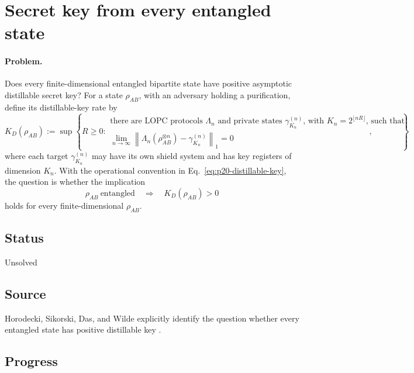 \section{Secret key from every entangled state}
\label{sec:problem-20}

\paragraph{Problem.}
Does every finite-dimensional entangled bipartite state have positive
asymptotic distillable secret key?  For a state $\rho_{AB}$, with an adversary
holding a purification, define its distillable-key rate by
\begin{equation}
  K_D(\rho_{AB})
  :=\sup\left\{R\geq0:
    \begin{array}{l}
      \text{there are LOPC protocols $\Lambda_n$ and private states
      $\gamma^{(n)}_{K_n}$, with $K_n=2^{\lfloor nR\rfloor}$, such that}\\[-1mm]
      \displaystyle
      \lim_{n\to\infty}
      \left\|\Lambda_n(\rho_{AB}^{\otimes n})
      -\gamma^{(n)}_{K_n}\right\|_1=0
    \end{array}
  \right\},
  \label{eq:p20-distillable-key}
\end{equation}
where each target $\gamma^{(n)}_{K_n}$ may have its own shield system and has
key registers of dimension $K_n$.  With the operational convention in
Eq.~\eqref{eq:p20-distillable-key},
the question is whether the implication
\begin{equation}
  \rho_{AB}\ \text{entangled}
  \quad\Longrightarrow\quad
  K_D(\rho_{AB})>0
  \label{eq:p20-entanglement-implies-key}
\end{equation}
holds for every finite-dimensional $\rho_{AB}$.

\subsection*{Status}

Unsolved

\subsection*{Source}

Horodecki, Sikorski, Das, and Wilde explicitly identify the question whether
every entangled state has positive distillable key
.

\subsection*{Progress}

